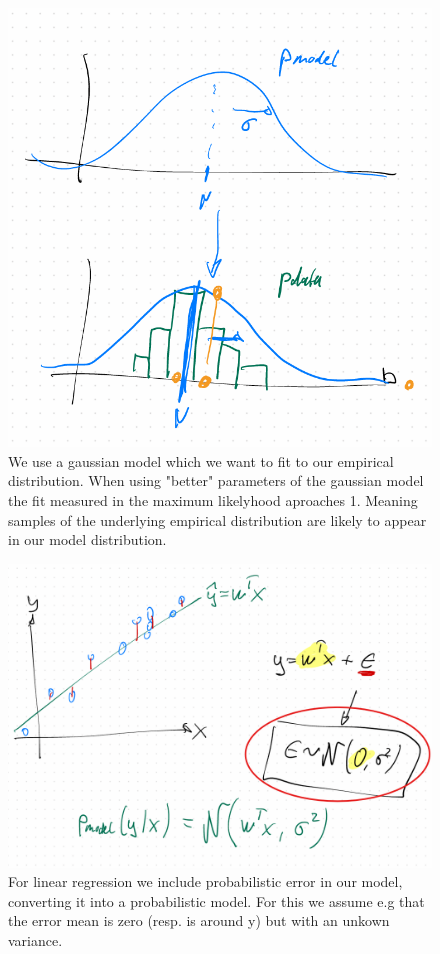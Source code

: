 \documentclass[../Main.tex]{subfiles}
\begin{document}
\begin{figure}[H]
    \centering
    \includegraphics[width=0.75\linewidth]{Images/estimation-pmodel.png}
    \caption{We use a gaussian model which we want to fit to our empirical distribution.
    When using "better" parameters of the gaussian model the fit measured in the maximum likelyhood aproaches 1.
    Meaning samples of the underlying empirical distribution are likely to appear in our model distribution.}
\end{figure}

\begin{figure}[H]
    \centering
    \includegraphics[width=0.75\linewidth]{Images/linear-regression-assumption.png}
    \caption{For linear regression we include probabilistic error in our model, converting it into a
    probabilistic model. For this we assume e.g that the error mean is zero (resp. is around y) but with an unkown variance.}
\end{figure}
\end{document}
